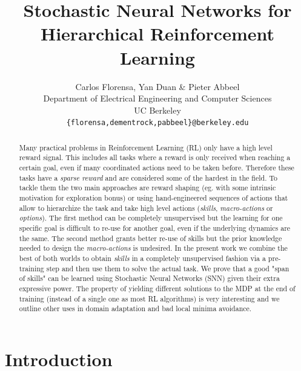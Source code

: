 \documentclass{article} %
\title{Stochastic Neural Networks for \\Hierarchical Reinforcement Learning}
\author{Carlos Florensa, Yan Duan \& Pieter Abbeel \\
Department of Electrical Engineering and Computer Sciences\\
UC Berkeley\\
\texttt{\{florensa,dementrock,pabbeel\}@berkeley.edu}
}
\begin{document}
	
	\maketitle

\begin{abstract}

Many practical problems in Reinforcement Learning (RL) only have a high level reward signal. This includes all tasks where a reward is only received when reaching a certain goal, even if many coordinated actions need to be taken before. Therefore these tasks have a \textit{sparse reward} and are considered some of the hardest in the field. To tackle them the two main approaches are reward shaping (eg. with some intrinsic motivation for exploration bonus) or using hand-engineered sequences of actions that allow to hierarchize the task and take high level actions (\textit{skills}, \textit{macro-actions} or \textit{options}). The first method can be completely unsupervised but the learning for one specific goal is difficult to re-use for another goal, even if the underlying dynamics are the same. The second method grants better re-use of skills but the prior knowledge needed to design the \textit{macro-actions} is undesired. In the present work we combine the best of both worlds to obtain \textit{skills} in a completely unsupervised fashion via a pre-training step and then use them to solve the actual task. We prove that a good "span of skills" can be learned using Stochastic Neural Networks (SNN) given their extra expressive power. The property of yielding different solutions to the MDP at the end of training (instead of a single one as most RL algorithms) is very interesting and we outline other uses in domain adaptation and bad local minima avoidance.
\end{abstract}

\section{Introduction}

\end{document}
